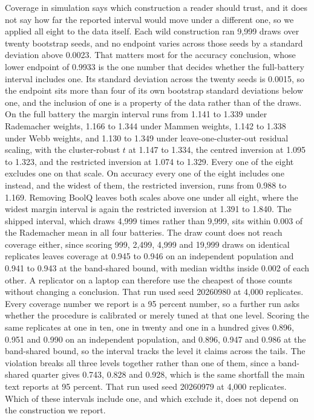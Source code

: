Coverage in simulation says which construction a reader should trust, and it does not say how far the reported interval would move under a different one, so we applied all eight to the data itself. Each wild construction ran 9,999 draws over twenty bootstrap seeds, and no endpoint varies across those seeds by a standard deviation above 0.0023. That matters most for the accuracy conclusion, whose lower endpoint of 0.9933 is the one number that decides whether the full-battery interval includes one. Its standard deviation across the twenty seeds is 0.0015, so the endpoint sits more than four of its own bootstrap standard deviations below one, and the inclusion of one is a property of the data rather than of the draws. On the full battery the margin interval runs from 1.141 to 1.339 under Rademacher weights, 1.166 to 1.344 under Mammen weights, 1.142 to 1.338 under Webb weights, and 1.130 to 1.349 under leave-one-cluster-out residual scaling, with the cluster-robust $t$ at 1.147 to 1.334, the centred inversion at 1.095 to 1.323, and the restricted inversion at 1.074 to 1.329. Every one of the eight excludes one on that scale. On accuracy every one of the eight includes one instead, and the widest of them, the restricted inversion, runs from 0.988 to 1.169. Removing BoolQ leaves both scales above one under all eight, where the widest margin interval is again the restricted inversion at 1.391 to 1.840. The shipped interval, which draws 4,999 times rather than 9,999, sits within 0.003 of the Rademacher mean in all four batteries. The draw count does not reach coverage either, since scoring 999, 2,499, 4,999 and 19,999 draws on identical replicates leaves coverage at 0.945 to 0.946 on an independent population and 0.941 to 0.943 at the band-shared bound, with median widths inside 0.002 of each other. A replicator on a laptop can therefore use the cheapest of those counts without changing a conclusion. That run used seed 20260980 at 4,000 replicates. Every coverage number we report is a 95 percent number, so a further run asks whether the procedure is calibrated or merely tuned at that one level. Scoring the same replicates at one in ten, one in twenty and one in a hundred gives 0.896, 0.951 and 0.990 on an independent population, and 0.896, 0.947 and 0.986 at the band-shared bound, so the interval tracks the level it claims across the tails. The violation breaks all three levels together rather than one of them, since a band-shared quarter gives 0.743, 0.828 and 0.928, which is the same shortfall the main text reports at 95 percent. That run used seed 20260979 at 4,000 replicates. Which of these intervals include one, and which exclude it, does not depend on the construction we report.

